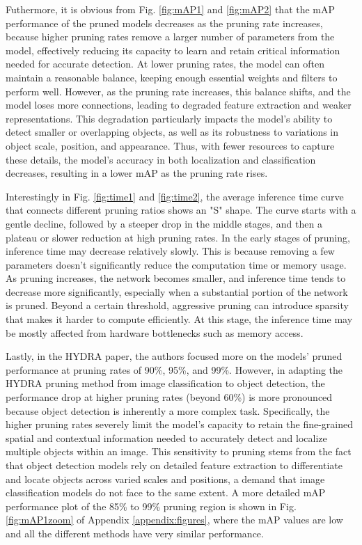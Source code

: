 \documentclass[journal,onecolumn,12pt]{IEEEtran}
\begin{document}
Futhermore, it is obvious from Fig. \ref{fig:mAP1} and \ref{fig:mAP2} that the mAP performance of the pruned models decreases as the pruning rate increases, because higher pruning rates remove a larger number of parameters from the model, effectively reducing its capacity to learn and retain critical information needed for accurate detection. At lower pruning rates, the model can often maintain a reasonable balance, keeping enough essential weights and filters to perform well. However, as the pruning rate increases, this balance shifts, and the model loses more connections, leading to degraded feature extraction and weaker representations. This degradation particularly impacts the model’s ability to detect smaller or overlapping objects, as well as its robustness to variations in object scale, position, and appearance. Thus, with fewer resources to capture these details, the model’s accuracy in both localization and classification decreases, resulting in a lower mAP as the pruning rate rises.

Interestingly in Fig. \ref{fig:time1} and \ref{fig:time2}, the average inference time curve that connects different pruning ratios shows an "S" shape. The curve starts with a gentle decline, followed by a steeper drop in the middle stages, and then a plateau or slower reduction at high pruning rates. In the early stages of pruning, inference time may decrease relatively slowly. This is because removing a few parameters doesn't significantly reduce the computation time or memory usage. As pruning increases, the network becomes smaller, and inference time tends to decrease more significantly, especially when a substantial portion of the network is pruned. Beyond a certain threshold, aggressive pruning can introduce sparsity that makes it harder to compute efficiently. At this stage, the inference time may be mostly affected from hardware bottlenecks such as memory access.

Lastly, in the HYDRA paper, the authors focused more on the models' pruned performance at pruning rates of 90\%, 95\%, and 99\%. However, in adapting the HYDRA pruning method from image classification to object detection, the performance drop at higher pruning rates (beyond 60\%) is more pronounced because object detection is inherently a more complex task. Specifically, the higher pruning rates severely limit the model's capacity to retain the fine-grained spatial and contextual information needed to accurately detect and localize multiple objects within an image. This sensitivity to pruning stems from the fact that object detection models rely on detailed feature extraction to differentiate and locate objects across varied scales and positions, a demand that image classification models do not face to the same extent. A more detailed mAP performance plot of the 85\% to 99\% pruning region is shown in Fig. \ref{fig:mAP1zoom} of Appendix \ref{appendix:figures}, where the mAP values are low and all the different methods have very similar performance.
\end{document}
